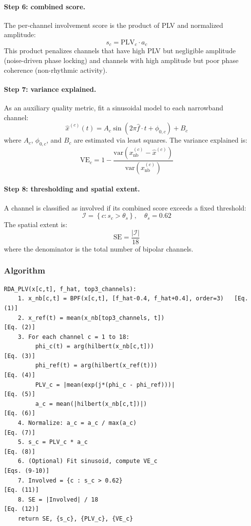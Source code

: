 \paragraph{Step 6: combined score.}
The per-channel involvement score is the product of PLV and normalized amplitude:
\[ s_c = \mathrm{PLV}_c \cdot a_c \tag{8} \]
This product penalizes channels that have high PLV but negligible amplitude (noise-driven phase locking) and channels with high amplitude but poor phase coherence (non-rhythmic activity).

\paragraph{Step 7: variance explained.}
As an auxiliary quality metric, fit a sinusoidal model to each narrowband channel:
\[ \hat{x}^{(c)}(t) = A_c \sin(2\pi \hat{f} \cdot t + \phi_{0,c}) + B_c \tag{9} \]
where $A_c$, $\phi_{0,c}$, and $B_c$ are estimated via least squares. The variance explained is:
\[ \mathrm{VE}_c = 1 - \frac{\mathrm{var}\!\left(x_{\mathrm{nb}}^{(c)} - \hat{x}^{(c)}\right)}{\mathrm{var}\!\left(x_{\mathrm{nb}}^{(c)}\right)} \tag{10} \]

\paragraph{Step 8: thresholding and spatial extent.}
A channel is classified as involved if its combined score exceeds a fixed threshold:
\[ \mathcal{I} = \left\{c : s_c > \theta_s\right\}, \quad \theta_s = 0.62 \tag{11} \]
The spatial extent is:
\[ \mathrm{SE} = \frac{|\mathcal{I}|}{18} \tag{12} \]
where the denominator is the total number of bipolar channels.

\subsubsection{Algorithm}

\begin{verbatim}
RDA_PLV(x[c,t], f_hat, top3_channels):
    1. x_nb[c,t] = BPF(x[c,t], [f_hat-0.4, f_hat+0.4], order=3)   [Eq. (1)]
    2. x_ref(t) = mean(x_nb[top3_channels, t])                      [Eq. (2)]
    3. For each channel c = 1 to 18:
         phi_c(t) = arg(hilbert(x_nb[c,t]))                         [Eq. (3)]
         phi_ref(t) = arg(hilbert(x_ref(t)))                        [Eq. (4)]
         PLV_c = |mean(exp(j*(phi_c - phi_ref)))|                   [Eq. (5)]
         a_c = mean(|hilbert(x_nb[c,t])|)                           [Eq. (6)]
    4. Normalize: a_c = a_c / max(a_c)                               [Eq. (7)]
    5. s_c = PLV_c * a_c                                             [Eq. (8)]
    6. (Optional) Fit sinusoid, compute VE_c                      [Eqs. (9-10)]
    7. Involved = {c : s_c > 0.62}                                  [Eq. (11)]
    8. SE = |Involved| / 18                                          [Eq. (12)]
    return SE, {s_c}, {PLV_c}, {VE_c}
\end{verbatim}

